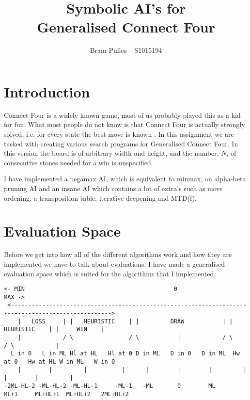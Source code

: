 \documentclass[a4paper]{article}
\author{Bram Pulles -- S1015194}
\title{\textbf{Symbolic AI's for\\ Generalised Connect Four}}
\begin{document}
\maketitle

\tableofcontents

\pagebreak
\section{Introduction}
Connect Four is a widely known game, most of us probably played this as a kid
for fun. What most people do not know is that Connect Four is actually strongly
solved, i.e. for every state the best move is known
\cite{wiki:strongly_solved}. In this assignment we are tasked with creating
various search programs for Generalised Connect Four. In this version the board
is of arbitrary width and height, and the number, $N$, of consecutive stones needed
for a win is unspecified.

I have implemented a negamax AI, which is equivalent to minmax, an alpha-beta
pruning AI and an insane AI which contains a lot of extra's such as move
ordening, a transposition table, iterative deepening and MTD(f).


\section{Evaluation Space}
Before we get into how all of the different algorithms work and how they are
implemented we have to talk about evaluations. I have made a generalised
evaluation space which is suited for the algorithms that I implemented.

\begin{lstlisting}[basicstyle = \ttfamily\tiny, columns = fixed]
 <- MIN                                           0                                             MAX ->
 <--------------------------------------------------------------------------------------------------->
    |   LOSS     | |   HEURISTIC    | |         DRAW           | |    HEURISTIC    | |     WIN    |
    |            / \                / \           |            / \                 / \            |
  L in 0   L in ML Hl at HL   Hl at 0 D in ML   D in 0   D in ML  Hw at 0   Hw at HL W in ML   W in 0
    |        |         |          |      |        |        |         |         |        |         |
-2ML-HL-2 -ML-HL-2 -ML-HL-1     -ML-1   -ML       0        ML      ML+1     ML+HL+1  ML+HL+2   2ML+HL+2
\end{lstlisting}
\end{document}

